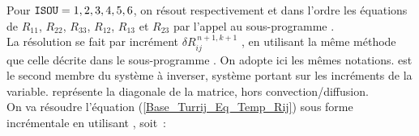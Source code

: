 Pour $\text{\texttt{ISOU}} = 1,2,3,4,5,6$, on résout respectivement et dans
l'ordre  les
équations de $R_{11}$, $R_{22}$, $R_{33}$, $R_{12}$, $R_{13}$ et $R_{23}$ par
l'appel au sous-programme .\\
La résolution se fait par incrément $\delta {R}_{ij}^{\,n+1,k+1}$ , en utilisant la même méthode que
celle décrite dans le sous-programme . On adopte ici les mêmes notations.
 est le second membre du système à inverser, système portant sur
les incréments de la variable.  représente la diagonale de la
matrice, hors convection/diffusion.\\
On va résoudre l'équation (\ref{Base_Turrij_Eq_Temp_Rij}) sous forme incrémentale en
utilisant , soit~:
